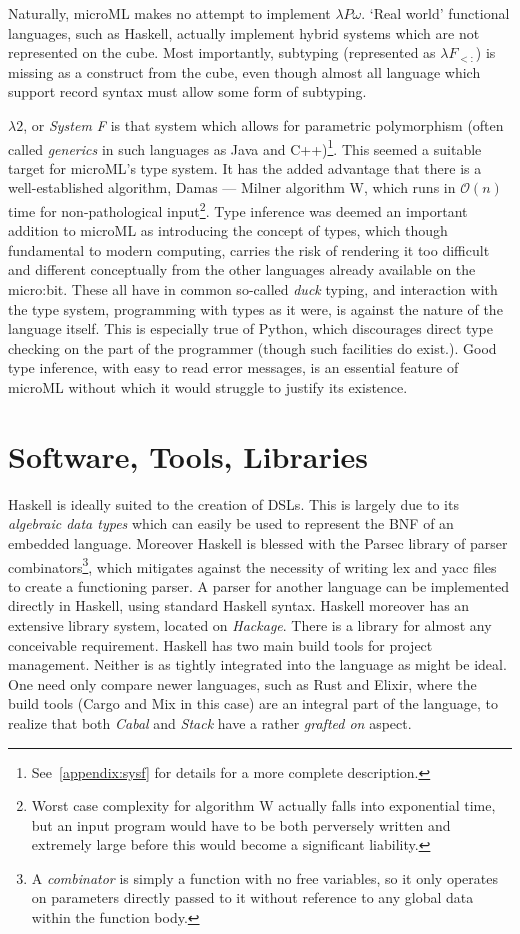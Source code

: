 \documentclass[12pt, a4paper]{report}
\begin{document}
Naturally, microML makes no attempt to implement $\lambda P\omega$. `Real world' functional
languages, such as Haskell, actually implement hybrid systems which are not represented on the cube.
Most importantly, subtyping (represented as $\lambda F_{<:}$) is missing as a construct from the cube, 
even though almost all language which support record syntax must allow some form of subtyping.

$\lambda 2$, or \textit{System F} is that system which allows for parametric polymorphism (often
called \textit{generics} in such languages as Java and C++)\footnote{See~\ref{appendix:sysf} for
details for a more complete description.}. This seemed a suitable target for microML's type system.
It has the added advantage that there is a well-established algorithm, Damas --- Milner algorithm
W, which runs in $\mathcal{O}(n)$ time for non-pathological input\footnote{Worst case complexity
for algorithm W actually falls into exponential time, but an input program would have to be both
perversely written and extremely large before this would become a significant liability.}. Type
inference was deemed an important addition to microML as introducing the concept of types, which
though fundamental to modern computing, carries the risk of rendering it too difficult and different
conceptually from the other languages already available on the micro:bit. These all have in common
so-called \textit{duck} typing, and interaction with the type system, programming with types as
it were, is against the nature of the language itself. This is especially true of Python, which
discourages direct type checking on the part of the programmer (though such facilities do exist.).
Good type inference, with easy to read error messages, is an essential feature of microML without
which it would struggle to justify its existence.

\section{Software, Tools, Libraries}
Haskell is ideally suited to the creation of DSLs. This is largely due to its \textit{algebraic data
    types} which can easily be used to represent the BNF of an embedded language. Moreover Haskell is
blessed with the Parsec library of parser combinators\footnote{A \textit{combinator} is simply a
    function with no free variables, so it only operates on parameters directly passed to it without
    reference to any global data within the function body.}, which mitigates against the necessity of
writing lex and yacc files to create a functioning parser. A parser for another language can be
implemented directly in Haskell, using standard Haskell syntax. Haskell moreover has an extensive
library system, located on \textit{Hackage}. There is a library for almost any conceivable
requirement. Haskell has two main build tools for project management. Neither is as tightly
integrated into the language as might be ideal. One need only compare newer languages, such as Rust
and Elixir, where the build tools (Cargo and Mix in this case) are an integral part of the language,
to realize that both \textit{Cabal} and \textit{Stack} have a rather \textit{grafted on} aspect.
\end{document}
